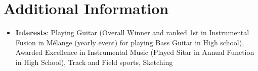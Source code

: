 \documentclass[a4paper,20pt]{article}
\newcommand{\resumeItem}[2]{
  \item\small{
    \textbf{#1}{: #2 \vspace{-2pt}}
  }
}
\newcommand{\resumeSubItem}[2]{\resumeItem{#1}{#2}\vspace{-3pt}}
\newcommand{\resumeSubHeadingListStart}{\begin{itemize}[leftmargin=*]}
\newcommand{\resumeSubHeadingListEnd}{\end{itemize}}
\begin{document}
\section{Additional Information}
	\resumeSubHeadingListStart
    \resumeSubItem{Interests} {Playing Guitar (Overall Winner and ranked 1st in Instrumental Fusion in Mélange (yearly event) for playing Bass Guitar in High school), Awarded Excellence in Instrumental Music (Played Sitar in Annual Function in High School), Track and Field sports, Sketching}
    \resumeSubHeadingListEnd
\end{document}
